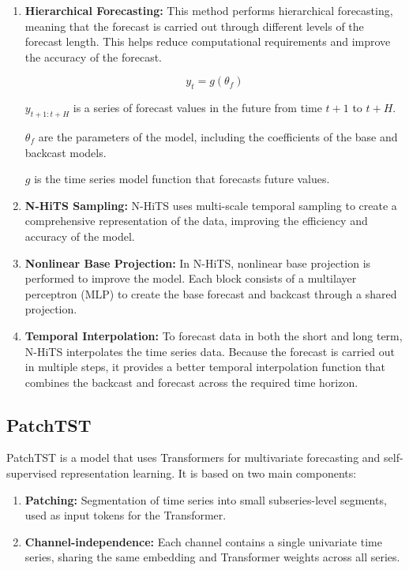 \documentclass{ieeeojies}
\begin{document}
\begin{enumerate}
  \item \textbf{Hierarchical Forecasting:} This method performs hierarchical forecasting, meaning that the forecast is carried out through different levels of the forecast length. This helps reduce computational requirements and improve the accuracy of the forecast.
  
  \[
  y_t = g(\theta_f)
  \]
  
  \( y_{t+1:t+H} \) is a series of forecast values in the future from time \( t+1 \) to \( t+H \).

  \( \theta_f \) are the parameters of the model, including the coefficients of the base and backcast models.

  \( g \) is the time series model function that forecasts future values.

  \item \textbf{N-HiTS Sampling:} N-HiTS uses multi-scale temporal sampling to create a comprehensive representation of the data, improving the efficiency and accuracy of the model.

  \item \textbf{Nonlinear Base Projection:} In N-HiTS, nonlinear base projection is performed to improve the model. Each block consists of a multilayer perceptron (MLP) to create the base forecast and backcast through a shared projection.

  \item \textbf{Temporal Interpolation:} To forecast data in both the short and long term, N-HiTS interpolates the time series data. Because the forecast is carried out in multiple steps, it provides a better temporal interpolation function that combines the backcast and forecast across the required time horizon.
\end{enumerate}


\subsection{PatchTST}
PatchTST is a model that uses Transformers for multivariate forecasting and self-supervised representation learning. It is based on two main components:
\begin{enumerate}
    \item \textbf{Patching:} Segmentation of time series into small subseries-level segments, used as input tokens for the Transformer.
    \item \textbf{Channel-independence:} Each channel contains a single univariate time series, sharing the same embedding and Transformer weights across all series.
\end{enumerate}
\end{document}
